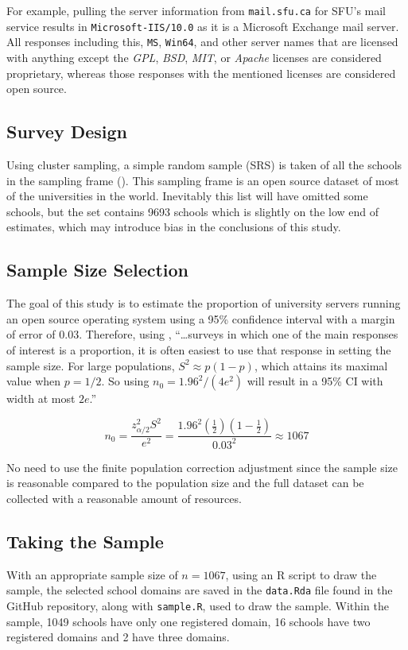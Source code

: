 \documentclass{article}
\theoremstyle{definition}
\begin{document}
\begin{flushleft}
\begin{multicols}{2}
For example, pulling the server information from \texttt{mail.sfu.ca} for
SFU's mail service results in \texttt{Microsoft-IIS/10.0} as it is a
Microsoft Exchange mail server. All responses including this, \texttt{MS},
\texttt{Win64}, and other server names that are licensed with anything
except the \textit{GPL}, \textit{BSD}, \textit{MIT}, or \textit{Apache}
licenses are considered proprietary, whereas those responses with
the mentioned licenses are considered open source.

\subsection{Survey Design}

Using cluster
sampling, a simple random sample (SRS) is taken of all the schools in the sampling
frame (\cite{Hipo}). This sampling frame is an open source dataset
of most of the universities in the world. Inevitably
this list will have omitted some schools, but the set
contains 9693 schools which is slightly on the low
end of estimates, which may introduce bias in the
conclusions of this study.

\subsection{Sample Size Selection}
The goal of this study is
to estimate the proportion of university servers
running an open source operating system using a 95\% confidence
interval with a margin of error of 0.03.
Therefore, using
\cite{lohr2019},
``\dots surveys in which one of the main responses of interest
is a proportion, it is often easiest to use that response
in setting the sample size.
For large populations, $S^2 \approx p(1-p)$, which
attains its maximal value when $p=1/2$. So using
$n_0=1.96^2/(4e^2)$ will result in a 95\% CI with width at most
$2e$.''

$$
	n_0
	=
	\frac{
		z^2_{\alpha/2}S^2
	}{
		e^2
	}
	=
	\frac{
		1.96^2(\frac{1}{2})(1-\frac{1}{2})
	}{
		0.03^2
	}
	\approx
	1067
$$

No need to use the finite population correction adjustment
since the sample size
is reasonable compared to the population size and the full
dataset can be collected with a reasonable amount of resources.

\subsection{Taking the Sample}
With an appropriate sample size of $n=1067$,
using an R script to
draw the sample, the selected school domains
are saved in the \texttt{data.Rda} file found
in the GitHub repository, along with \texttt{sample.R},
used to draw the sample.
Within the sample, 1049 schools have only
one registered domain, 16 schools have two
registered domains and 2 have three
domains.


\end{multicols}
\end{flushleft}
\end{document}
